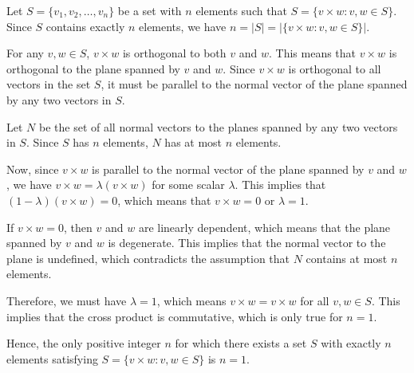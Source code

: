 Let $S = \{v_1, v_2, \ldots, v_n\}$ be a set with $n$ elements such that $S = \{v \times w: v, w \in S\}$. Since $S$ contains exactly $n$ elements, we have $n = |S| = |\{v \times w: v, w \in S\}|$. 

For any $v, w \in S$, $v \times w$ is orthogonal to both $v$ and $w$. This means that $v \times w$ is orthogonal to the plane spanned by $v$ and $w$. Since $v \times w$ is orthogonal to all vectors in the set $S$, it must be parallel to the normal vector of the plane spanned by any two vectors in $S$. 

Let $N$ be the set of all normal vectors to the planes spanned by any two vectors in $S$. Since $S$ has $n$ elements, $N$ has at most $n$ elements. 

Now, since $v \times w$ is parallel to the normal vector of the plane spanned by $v$ and $w$, we have $v \times w = \lambda(v \times w)$ for some scalar $\lambda$. This implies that $(1-\lambda)(v \times w) = 0$, which means that $v \times w = 0$ or $\lambda = 1$. 

If $v \times w = 0$, then $v$ and $w$ are linearly dependent, which means that the plane spanned by $v$ and $w$ is degenerate. This implies that the normal vector to the plane is undefined, which contradicts the assumption that $N$ contains at most $n$ elements. 

Therefore, we must have $\lambda = 1$, which means $v \times w = v \times w$ for all $v, w \in S$. This implies that the cross product is commutative, which is only true for $n = 1$.

Hence, the only positive integer $n$ for which there exists a set $S$ with exactly $n$ elements satisfying $S = \{v \times w: v, w \in S\}$ is $n = 1$.
